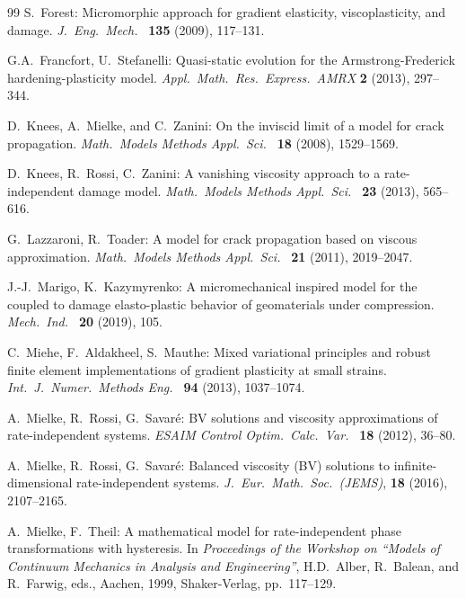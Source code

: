 \documentclass[reqno]{amsart}
\theoremstyle{definition}
\numberwithin{equation}{section}
\begin{document}
\begin{thebibliography}{99}
{\sc S.~Forest}: 
Micromorphic approach for gradient elasticity, viscoplasticity, and damage.
{\it J.\ Eng.\ Mech.\ } {\bf 135} (2009), 117--131.

{\sc G.A.~Francfort, U.~Stefanelli}:
Quasi-static evolution for the Armstrong-Frederick hardening-plasticity model.
{\it Appl.\ Math.\ Res.\ Express.\ AMRX} {\bf 2} (2013), 297--344.
 
{\sc D.~Knees, A.~Mielke, and C.~Zanini}:
 On the inviscid limit of a model for crack propagation.
 {\it Math.\ Models Methods Appl.\ Sci.\ } {\bf 18} (2008), 1529--1569.

{\sc D.~Knees, R.~Rossi, C.~Zanini}: 
A vanishing viscosity approach to a rate-independent damage model. 
{\it Math.\ Models Methods Appl.\ Sci.\ } {\bf 23} (2013), 565--616.

{\sc G.~Lazzaroni, R.~Toader}:
A model for crack propagation based on viscous approximation.
{\it Math.\ Models Methods Appl.\ Sci.\ } {\bf 21} (2011), 2019--2047.

{\sc J.-J.~Marigo, K.~Kazymyrenko}: 
A micromechanical inspired model for the coupled to damage elasto-plastic behavior of geomaterials under compression.
{\it Mech.\ Ind.\ } {\bf 20} (2019), 105.

{\sc C.~Miehe, F.~Aldakheel, S.~Mauthe}: 
Mixed variational principles and robust finite element implementations of gradient plasticity at small strains.
{\it Int.\ J.\ Numer.\ Methods Eng.\ } {\bf 94} (2013), 1037--1074.

{\sc A.~Mielke, R.~Rossi, G.~Savaré}: 
BV solutions and viscosity approximations of rate-independent systems. 
{\it ESAIM Control Optim.\ Calc.\ Var.\ } {\bf 18} (2012), 36--80.

{\sc A.~Mielke, R.~Rossi, G.~Savaré}: 
Balanced viscosity (BV) solutions to infinite-dimensional rate-independent systems.
{\it J.\ Eur.\ Math.\ Soc.\ (JEMS)}, {\bf 18} (2016), 2107--2165.


{\sc A.~Mielke, F.~Theil}: A mathematical model for rate-independent phase transformations with hysteresis.
{In \it Proceedings of the Workshop on ``Models of Continuum Mechanics in Analysis and Engineering''}, H.D.~Alber, R.~Balean, and R.~Farwig, eds., Aachen, 1999, Shaker-Verlag, pp.~117--129.
  

\end{thebibliography}
\end{document}
